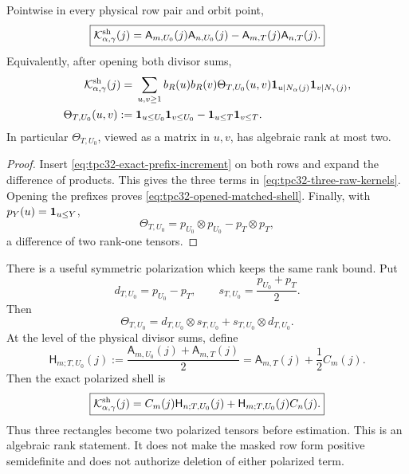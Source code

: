 \begin{proposition}
\label{prop:tpc32-exact-cutoff-shell}
Pointwise in every physical row pair and orbit point,
\begin{equation}
 \boxed{
 \mathcal K^{\mathrm{sh}}_{\alpha,\gamma}(j)
 =\mathsf A_{m,U_0}(j)\mathsf A_{n,U_0}(j)
  -\mathsf A_{m,T}(j)\mathsf A_{n,T}(j).}
 \label{eq:tpc32-exact-cutoff-shell}
\end{equation}
Equivalently, after opening both divisor sums,
\begin{align}
 \mathcal K^{\mathrm{sh}}_{\alpha,\gamma}(j)
 ={}&\sum_{u,v\ge1}b_R(u)b_R(v)
 \Theta_{T,U_0}(u,v)
 \mathbf 1_{u\mid N_\alpha(j)}\mathbf 1_{v\mid N_\gamma(j)},
 \label{eq:tpc32-opened-matched-shell}\\
 \Theta_{T,U_0}(u,v)
 :={}&\mathbf 1_{u\le U_0}\mathbf 1_{v\le U_0}
       -\mathbf 1_{u\le T}\mathbf 1_{v\le T}.
 \label{eq:tpc32-cutoff-tensor}
\end{align}
In particular \(\Theta_{T,U_0}\), viewed as a matrix in \(u,v\), has
algebraic rank at most two.
\end{proposition}

\begin{proof}
Insert \eqref{eq:tpc32-exact-prefix-increment} on both rows and expand
the difference of products.  This gives the three terms in
\eqref{eq:tpc32-three-raw-kernels}.  Opening the prefixes proves
\eqref{eq:tpc32-opened-matched-shell}.  Finally, with
\(p_Y(u)=\mathbf 1_{u\le Y}\),
\[
 \Theta_{T,U_0}=p_{U_0}\otimes p_{U_0}-p_T\otimes p_T,
\]
a difference of two rank-one tensors.
\end{proof}

There is a useful symmetric polarization which keeps the same rank
bound.  Put
\begin{equation}
 d_{T,U_0}=p_{U_0}-p_T,
 \qquad
 s_{T,U_0}=\frac{p_{U_0}+p_T}{2}.
 \label{eq:tpc32-cutoff-polarization-vectors}
\end{equation}
Then
\begin{equation}
 \boxed{
 \Theta_{T,U_0}
 =d_{T,U_0}\otimes s_{T,U_0}
  +s_{T,U_0}\otimes d_{T,U_0}.}
 \label{eq:tpc32-cutoff-polarization}
\end{equation}
At the level of the physical divisor sums, define
\begin{equation}
 \mathsf H_{m;T,U_0}(j)
 :=\frac{\mathsf A_{m,U_0}(j)+\mathsf A_{m,T}(j)}2
 =\mathsf A_{m,T}(j)+\frac12C_m(j).
 \label{eq:tpc32-half-prefix}
\end{equation}
Then the exact polarized shell is
\begin{equation}
 \boxed{
 \mathcal K^{\mathrm{sh}}_{\alpha,\gamma}(j)
 =C_m(j)\mathsf H_{n;T,U_0}(j)
  +\mathsf H_{m;T,U_0}(j)C_n(j).}
 \label{eq:tpc32-physical-polarization}
\end{equation}
Thus three rectangles become two polarized tensors before estimation.
This is an algebraic rank statement.  It does not make the masked row
form positive semidefinite and does not authorize deletion of either
polarized term.

